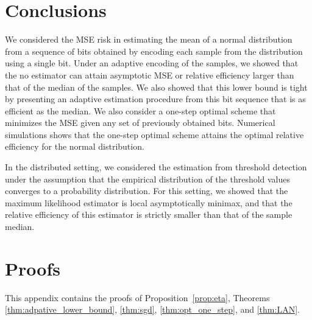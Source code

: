\documentclass[letterpaper, conference, 11pt]{IEEEtran}      %
\begin{document}
\section{Conclusions \label{sec:conclusions}}
We considered the MSE risk in estimating the mean of a normal distribution from a sequence of bits obtained by encoding each sample from the distribution using a single bit. Under an adaptive encoding of the samples, we showed that the no estimator can attain asymptotic MSE or relative efficiency larger than that of the median of the samples. We also showed that this lower bound is tight by presenting an adaptive estimation procedure from this bit sequence that is as efficient as the median. We also consider a one-step optimal scheme that minimizes the MSE given any set of previously obtained bits. Numerical simulations shows that the one-step optimal scheme attains the optimal relative efficiency for the normal distribution. 
\par
In the distributed setting, we considered the estimation from threshold detection under the assumption that the empirical distribution of the threshold values converges to a probability distribution. For this setting, we showed that the maximum likelihood estimator is local asymptotically minimax, and that the relative efficiency of this estimator is strictly smaller than that of the sample median.  \\




\appendix


\section{Proofs \label{app:proofs}}
This appendix contains the proofs of Proposition~\ref{prop:eta}, Theorems \ref{thm:adpative_lower_bound}, \ref{thm:sgd}, \ref{thm:opt_one_step}, and \ref{thm:LAN}. 
\end{document}
